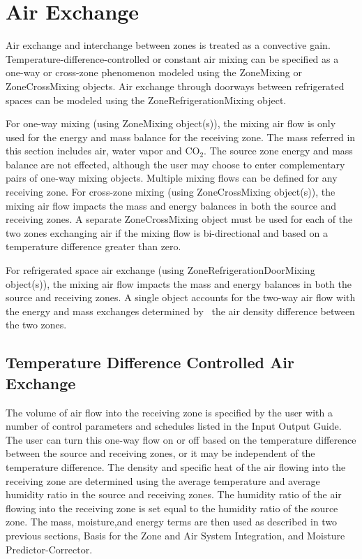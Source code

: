 \section{Air Exchange}\label{air-exchange}

Air exchange and interchange between zones is treated as a convective gain. Temperature-difference-controlled or constant air mixing can be specified as a one-way or cross-zone phenomenon modeled using the ZoneMixing or ZoneCrossMixing objects. Air exchange through doorways between refrigerated spaces can be modeled using the ZoneRefrigerationMixing object.

For one-way mixing (using ZoneMixing object(s)), the mixing air flow is only used for the energy and mass balance for the receiving zone. The mass referred in this section includes air, water vapor and CO\(_{2}\). The source zone energy and mass balance are not effected, although the user may choose to enter complementary pairs of one-way mixing objects. Multiple mixing flows can be defined for any receiving zone. For cross-zone mixing (using ZoneCrossMixing object(s)), the mixing air flow impacts the mass and energy balances in both the source and receiving zones. A separate ZoneCrossMixing object must be used for each of the two zones exchanging air if the mixing flow is bi-directional and based on a temperature difference greater than zero.

For refrigerated space air exchange (using ZoneRefrigerationDoorMixing object(s)), the mixing air flow impacts the mass and energy balances in both the source and receiving zones. A single object accounts for the two-way air flow with the energy and mass exchanges determined by~ the air density difference between the two zones.

\subsection{Temperature Difference Controlled Air Exchange}\label{temperature-difference-controlled-air-exchange}

The volume of air flow into the receiving zone is specified by the user with a number of control parameters and schedules listed in the Input Output Guide. The user can turn this one-way flow on or off based on the temperature difference between the source and receiving zones, or it may be independent of the temperature difference. The density and specific heat of the air flowing into the receiving zone are determined using the average temperature and average humidity ratio in the source and receiving zones. The humidity ratio of the air flowing into the receiving zone is set equal to the humidity ratio of the source zone. The mass, moisture,and energy terms are then used as described in two previous sections, Basis for the Zone and Air System Integration, and Moisture Predictor-Corrector.

